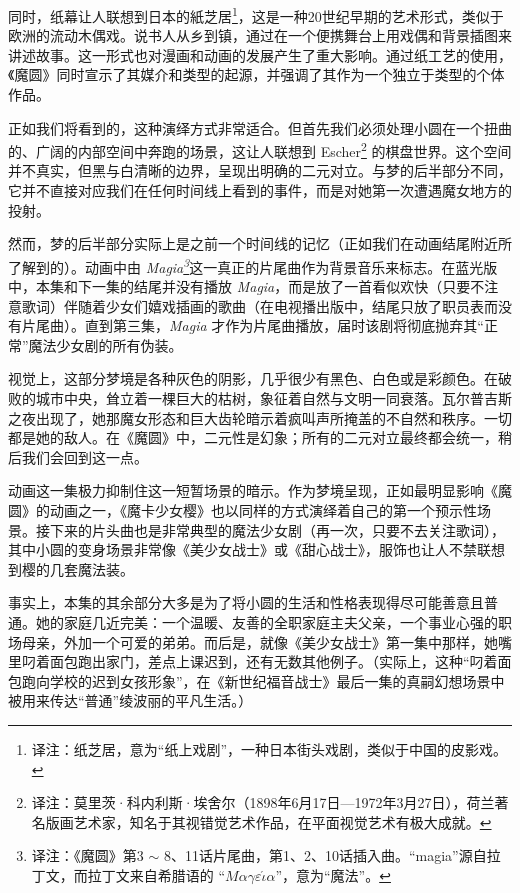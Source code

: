 同时，纸幕让人联想到日本的紙芝居\footnote{译注：纸芝居，意为“纸上戏剧”，一种日本街头戏剧，类似于中国的皮影戏。}，这是一种20世纪早期的艺术形式，类似于欧洲的流动木偶戏。说书人从乡到镇，通过在一个便携舞台上用戏偶和背景插图来讲述故事\cite{ref10}。这一形式也对漫画和动画的发展产生了重大影响\cite{ref10}。通过纸工艺的使用，《魔圆》同时宣示了其媒介和类型的起源，并强调了其作为一个独立于类型的个体作品。

正如我们将看到的，这种演绎方式非常适合。但首先我们必须处理小圆在一个扭曲的、广阔的内部空间中奔跑的场景，这让人联想到 Escher\footnote{译注：莫里茨·科内利斯·埃舍尔（1898年6月17日—1972年3月27日），荷兰著名版画艺术家，知名于其视错觉艺术作品，在平面视觉艺术有极大成就。} 的棋盘世界。这个空间并不真实，但黑与白清晰的边界，呈现出明确的二元对立。与梦的后半部分不同，它并不直接对应我们在任何时间线上看到的事件，而是对她第一次遭遇魔女地方的投射。

然而，梦的后半部分实际上是之前一个时间线的记忆（正如我们在动画结尾附近所了解到的）。动画中由 \emph{Magia\footnote{译注：《魔圆》第3 $\sim$ 8、11话片尾曲，第1、2、10话插入曲。``magia''源自拉丁文，而拉丁文来自希腊语的 ``$M\alpha\gamma\varepsilon\acute{\iota}\alpha$''，意为“魔法”。}}这一真正的片尾曲作为背景音乐来标志。在蓝光版中，本集和下一集的结尾并没有播放 \emph{Magia}，而是放了一首看似欢快（只要不注意歌词）伴随着少女们嬉戏插画的歌曲（在电视播出版中，结尾只放了职员表而没有片尾曲）。直到第三集，\emph{Magia} 才作为片尾曲播放，届时该剧将彻底抛弃其“正常”魔法少女剧的所有伪装。

视觉上，这部分梦境是各种灰色的阴影，几乎很少有黑色、白色或是彩颜色。在破败的城市中央，耸立着一棵巨大的枯树，象征着自然与文明一同衰落。瓦尔普吉斯之夜出现了，她那魔女形态和巨大齿轮暗示着疯叫声所掩盖的不自然和秩序。一切都是她的敌人。在《魔圆》中，二元性是幻象；所有的二元对立最终都会统一，稍后我们会回到这一点。

动画这一集极力抑制住这一短暂场景的暗示。作为梦境呈现，正如最明显影响《魔圆》的动画之一，《魔卡少女樱》也以同样的方式演绎着自己的第一个预示性场景\cite{ref11}。接下来的片头曲也是非常典型的魔法少女剧（再一次，只要不去关注歌词），其中小圆的变身场景非常像《美少女战士》\cite{ref12}或《甜心战士》\cite{ref13}，服饰也让人不禁联想到樱的几套魔法装。

事实上，本集的其余部分大多是为了将小圆的生活和性格表现得尽可能善意且普通。她的家庭几近完美：一个温暖、友善的全职家庭主夫父亲，一个事业心强的职场母亲，外加一个可爱的弟弟。而后是，就像《美少女战士》第一集中那样，她嘴里叼着面包跑出家门，差点上课迟到，还有无数其他例子。（实际上，这种“叼着面包跑向学校的迟到女孩形象”，在《新世纪福音战士》最后一集的真嗣幻想场景中被用来传达“普通”绫波丽的平凡生活\cite{ref14}。）

